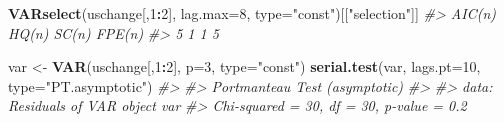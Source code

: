 \documentclass[]{book}
\newenvironment{Shaded}{\begin{snugshade}}{\end{snugshade}}
\newcommand{\CommentTok}[1]{\textcolor[rgb]{0.56,0.35,0.01}{\textit{#1}}}
\newcommand{\DataTypeTok}[1]{\textcolor[rgb]{0.13,0.29,0.53}{#1}}
\newcommand{\DecValTok}[1]{\textcolor[rgb]{0.00,0.00,0.81}{#1}}
\newcommand{\KeywordTok}[1]{\textcolor[rgb]{0.13,0.29,0.53}{\textbf{#1}}}
\newcommand{\NormalTok}[1]{#1}
\newcommand{\OperatorTok}[1]{\textcolor[rgb]{0.81,0.36,0.00}{\textbf{#1}}}
\newcommand{\StringTok}[1]{\textcolor[rgb]{0.31,0.60,0.02}{#1}}
\begin{document}
\begin{Shaded}
\begin{Highlighting}[]
\KeywordTok{VARselect}\NormalTok{(uschange[,}\DecValTok{1}\OperatorTok{:}\DecValTok{2}\NormalTok{], }\DataTypeTok{lag.max=}\DecValTok{8}\NormalTok{, }\DataTypeTok{type=}\StringTok{"const"}\NormalTok{)[[}\StringTok{"selection"}\NormalTok{]]}
\CommentTok{#> AIC(n)  HQ(n)  SC(n) FPE(n) }
\CommentTok{#>      5      1      1      5}

\NormalTok{var <-}\StringTok{ }\KeywordTok{VAR}\NormalTok{(uschange[,}\DecValTok{1}\OperatorTok{:}\DecValTok{2}\NormalTok{], }\DataTypeTok{p=}\DecValTok{3}\NormalTok{, }\DataTypeTok{type=}\StringTok{"const"}\NormalTok{)}
\KeywordTok{serial.test}\NormalTok{(var, }\DataTypeTok{lags.pt=}\DecValTok{10}\NormalTok{, }\DataTypeTok{type=}\StringTok{"PT.asymptotic"}\NormalTok{)}
\CommentTok{#> }
\CommentTok{#>  Portmanteau Test (asymptotic)}
\CommentTok{#> }
\CommentTok{#> data:  Residuals of VAR object var}
\CommentTok{#> Chi-squared = 30, df = 30, p-value = 0.2}


\end{Highlighting}
\end{Shaded}
\end{document}

